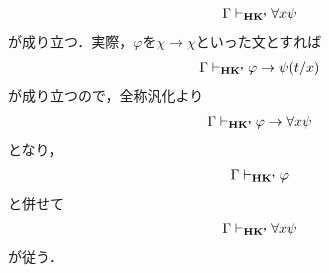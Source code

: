 \begin{metaprf}
\begin{description}
\begin{align}
				\Gamma \vdash_{{\scriptsize \mbox{{\bf HK'}}}} \forall x \psi
			\end{align}
			が成り立つ．実際，$\varphi$を$\chi \rightarrow \chi$といった文とすれば
			\begin{align}
				\Gamma \vdash_{{\scriptsize \mbox{{\bf HK'}}}} \varphi \rightarrow \psi(t/x)
			\end{align}
			が成り立つので，全称汎化より
			\begin{align}
				\Gamma \vdash_{{\scriptsize \mbox{{\bf HK'}}}} \varphi \rightarrow \forall x \psi
			\end{align}
			となり，
			\begin{align}
				\Gamma \vdash_{{\scriptsize \mbox{{\bf HK'}}}} \varphi
			\end{align}
			と併せて
			\begin{align}
				\Gamma \vdash_{{\scriptsize \mbox{{\bf HK'}}}} \forall x \psi
			\end{align}
			が従う．
			\QED
		\end{description}
	\end{metaprf}
	
